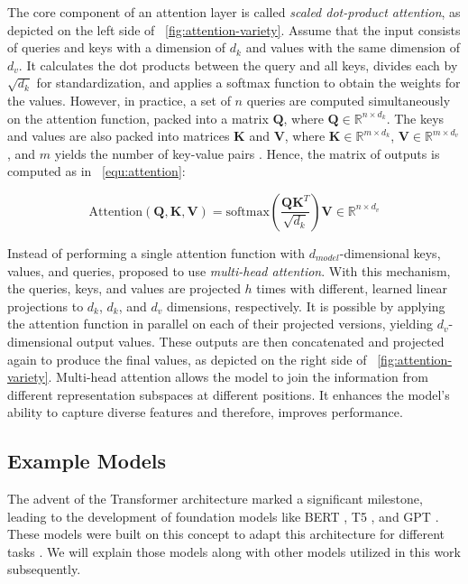 The core component of an attention layer is called \textit{scaled dot-product attention}, as depicted on the left side of \pic~\ref{fig:attention-variety}. Assume that the input consists of queries and keys with a dimension of $d_k$ and values with the same dimension of $d_v$. It calculates the dot products between the query and all keys, divides each by $\sqrt{d_k}$ for standardization, and applies a softmax function to obtain the weights for the values. However, in practice, a set of $n$ queries are computed simultaneously on the attention function, packed into a matrix $\mathbf{Q}$, where $\mathbf{Q} \in \mathbb{R}^{n \times d_k}$. The keys and values are also packed into matrices $\mathbf{K}$ and $\mathbf{V}$, where $\mathbf{K} \in \mathbb{R}^{m \times d_k}$, $\mathbf{V} \in \mathbb{R}^{m \times d_v}$, and $m$ yields the number of key-value pairs \citep{vaswani2023attentionneed}. Hence, the matrix of outputs is computed as in \equ~\ref{equ:attention}:

\noindent
\begin{equation}\label{equ:attention}
	\text{Attention}(\mathbf{Q}, \mathbf{K}, \mathbf{V}) = 
	\text{softmax}\left(\frac{\mathbf{Q}\mathbf{K}^{T}}{\sqrt{d_k}}\right)\mathbf{V} \in \mathbb{R}^{n \times d_v}
\end{equation}

Instead of performing a single attention function with $d_{model}$-dimensional keys, values, and queries, \cite{vaswani2023attentionneed} proposed to use \textit{multi-head attention}. With this mechanism, the queries, keys, and values are projected $h$ times with different, learned linear projections to $d_k$, $d_k$, and $d_v$ dimensions, respectively. It is possible by applying the attention function in parallel on each of their projected versions, yielding $d_v$-dimensional output values. These outputs are then concatenated and projected again to produce the final values, as depicted on the right side of \pic~\ref{fig:attention-variety}. Multi-head attention allows the model to join the information from different representation subspaces at different positions. It enhances the model’s ability to capture diverse features and therefore, improves performance.


\subsection{Example Models}
The advent of the Transformer architecture \citep{vaswani2023attentionneed} marked a significant milestone, leading to the development of foundation models like BERT \citep{devlin2019bertpretrainingdeepbidirectional}, T5 \citep{raffel2023exploringlimitstransferlearning}, and GPT \citep{radford2019language}. These models were built on this concept to adapt this architecture for different tasks \citep{raschka2024build}. We will explain those models along with other models utilized in this work subsequently.

